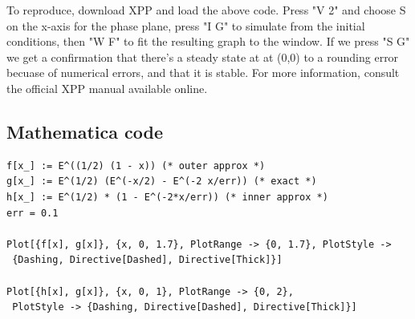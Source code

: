 \documentclass[12pt]{article}
\begin{document}
To reproduce, download XPP and load the above code. Press "V 2" and
choose S on the x-axis for the phase plane, press "I G" to simulate
from the initial conditions, then "W F" to fit the resulting graph to
the window. If we press "S G" we get a confirmation that there's a
steady state at at (0,0) to a rounding error becuase of numerical
errors, and that it is stable. For more information, consult the
official XPP manual available online.

\subsection{Mathematica code}
\begin{verbatim}
f[x_] := E^((1/2) (1 - x)) (* outer approx *)
g[x_] := E^(1/2) (E^(-x/2) - E^(-2 x/err)) (* exact *)
h[x_] := E^(1/2) * (1 - E^(-2*x/err)) (* inner approx *)
err = 0.1

Plot[{f[x], g[x]}, {x, 0, 1.7}, PlotRange -> {0, 1.7}, PlotStyle ->
 {Dashing, Directive[Dashed], Directive[Thick]}]

Plot[{h[x], g[x]}, {x, 0, 1}, PlotRange -> {0, 2}, 
 PlotStyle -> {Dashing, Directive[Dashed], Directive[Thick]}]
\end{verbatim}


\end{document}
